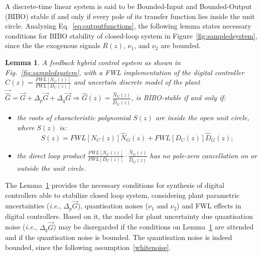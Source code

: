 \documentclass{sig-alternate-05-2015}
\newcommand{\red}[1]{{\color{red}#1}}
\newtheorem{mylemma}{Lemma}
\begin{document}

A discrete-time linear system is said to be Bounded-Input and Bounded-Output
(BIBO) stable if and only if every pole of its transfer function lies inside
the unit circle.  Analyzing Eq.~\eqref{eq:outputfunctions}, the following lemma
states necessary conditions for BIBO stability of closed-loop system in
Figure~\ref{fig:sampledsystem}, since the the exogenous signals $R(z)$,
$\nu_{1}$, and $\nu_{2}$ are bounded.

\begin{mylemma}{\cite{Bessa16,fadali}}
\label{lemma:eq_int_stab} 
%
A feedback hybrid control system as shown in Fig.~\ref{fig:sampledsystem},
with a FWL implementation of the digital controller $\hat{C}(z) =
\frac{FWL[N_{C}(z)]}{FWL[D_{C}(z)]}$ and uncertain discrete model of the
plant $\vec{\hat{G}}=\vec{G}+\Delta_p \vec{G}+\Delta_q \vec{G} \Rightarrow
\hat{G}(z)=\frac{\hat{N}_{G}(z)}{\hat{D}_{G}(z)}$, is BIBO-stable if and
only if:
%
\begin{itemize}
\item  the roots of characteristic polynomial $S(z)$ are inside the open unit circle, where $S(z)$ is:
\begin{equation}
\label{eq:internal_stab_lemma}
S(z)=FWL[N_{C}(z)]\hat{N}_{G}(z)+FWL[D_{C}(z)]\hat{D}_{G}(z);
\end{equation}
\item the direct loop product $\frac{FWL[N_{C}(z)]}{FWL[D_{C}(z)]}\cdot \frac{\hat{N}_{G}(z)}{\hat{D}_{G}(z)}$ has no pole-zero cancellation on or outside the unit circle.
\end{itemize}
\end{mylemma}

The Lemma~\ref{lemma:eq_int_stab} provides the necessary conditions for
synthesis of digital controllers able to stabilize closed loop system,
considering plant parametric uncertainties ({\it i.e.}, $\Delta_p \vec{G}$),
quantisation noises ($\nu_{1}$ and $\nu_{2}$) and FWL effects in digital
controllers.  Based on it, the model for plant uncertainty due quantisation
noise ({\it i.e.}, $\Delta_q \vec{G}$) may be disregarded if the conditions
on Lemma~\ref{lemma:eq_int_stab} are attended and if the quantisation noise
is bounded.  The quantisation noise is indeed bounded, since the following
assumption~\ref{whitenoise}.

\end{document}
